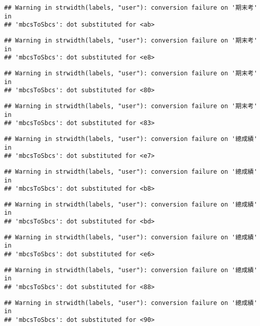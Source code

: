 \documentclass[
]{book}
\begin{document}
\begin{verbatim}
## Warning in strwidth(labels, "user"): conversion failure on '期末考' in
## 'mbcsToSbcs': dot substituted for <ab>
\end{verbatim}

\begin{verbatim}
## Warning in strwidth(labels, "user"): conversion failure on '期末考' in
## 'mbcsToSbcs': dot substituted for <e8>
\end{verbatim}

\begin{verbatim}
## Warning in strwidth(labels, "user"): conversion failure on '期末考' in
## 'mbcsToSbcs': dot substituted for <80>
\end{verbatim}

\begin{verbatim}
## Warning in strwidth(labels, "user"): conversion failure on '期末考' in
## 'mbcsToSbcs': dot substituted for <83>
\end{verbatim}

\begin{verbatim}
## Warning in strwidth(labels, "user"): conversion failure on '總成績' in
## 'mbcsToSbcs': dot substituted for <e7>
\end{verbatim}

\begin{verbatim}
## Warning in strwidth(labels, "user"): conversion failure on '總成績' in
## 'mbcsToSbcs': dot substituted for <b8>
\end{verbatim}

\begin{verbatim}
## Warning in strwidth(labels, "user"): conversion failure on '總成績' in
## 'mbcsToSbcs': dot substituted for <bd>
\end{verbatim}

\begin{verbatim}
## Warning in strwidth(labels, "user"): conversion failure on '總成績' in
## 'mbcsToSbcs': dot substituted for <e6>
\end{verbatim}

\begin{verbatim}
## Warning in strwidth(labels, "user"): conversion failure on '總成績' in
## 'mbcsToSbcs': dot substituted for <88>
\end{verbatim}

\begin{verbatim}
## Warning in strwidth(labels, "user"): conversion failure on '總成績' in
## 'mbcsToSbcs': dot substituted for <90>
\end{verbatim}
\end{document}
